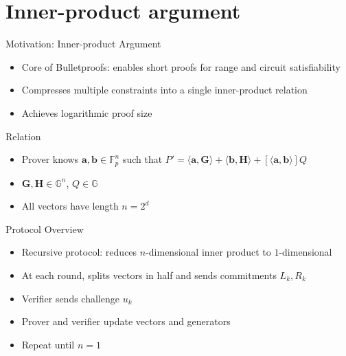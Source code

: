 \documentclass{zkdl-presentation-template}
\begin{document}
\section{Inner-product argument}

\begin{frame}{Motivation: Inner-product Argument}
    \begin{itemize}
        \item Core of Bulletproofs: enables short proofs for range and circuit satisfiability
        \item Compresses multiple constraints into a single inner-product relation
        \item Achieves logarithmic proof size
    \end{itemize}
\end{frame}

\begin{frame}{Relation}
    \begin{itemize}
        \item Prover knows $\mathbf{a}, \mathbf{b} \in \mathbb{F}_p^n$ such that $P' = \langle \mathbf{a}, \mathbf{G} \rangle + \langle \mathbf{b}, \mathbf{H} \rangle + [\langle \mathbf{a}, \mathbf{b} \rangle]Q$
        \item $\mathbf{G}, \mathbf{H} \in \mathbb{G}^n$, $Q \in \mathbb{G}$
        \item All vectors have length $n = 2^d$
    \end{itemize}
\end{frame}

\begin{frame}{Protocol Overview}
    \begin{itemize}
        \item Recursive protocol: reduces $n$-dimensional inner product to $1$-dimensional
        \item At each round, splits vectors in half and sends commitments $L_k, R_k$
        \item Verifier sends challenge $u_k$
        \item Prover and verifier update vectors and generators
        \item Repeat until $n = 1$
    \end{itemize}
\end{frame}
\end{document}
